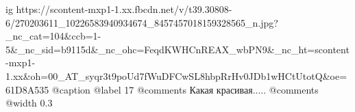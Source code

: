  
 
 
 
 

\ifcmt
  ig https://scontent-mxp1-1.xx.fbcdn.net/v/t39.30808-6/270203611_10226583940934674_8457457018159328565_n.jpg?_nc_cat=104&ccb=1-5&_nc_sid=b9115d&_nc_ohc=FeqdKWHCnREAX_wbPN9&_nc_ht=scontent-mxp1-1.xx&oh=00_AT_syqr3t9poUd7fWuDFCwSL8hbpRrHv0JDb1wHCtUtotQ&oe=61D8A535
	@caption @label 17
	@comments%
    Какая красивая.....
	@comments%
  @width 0.3
\fi
